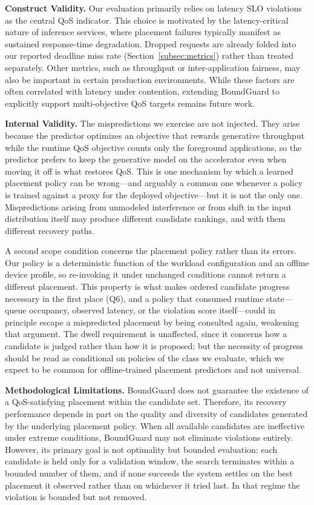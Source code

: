 \documentclass[conference]{IEEEtran}
\begin{document}
{\noindent\textbf{Construct Validity.} 
Our evaluation primarily relies on latency SLO violations as the central QoS indicator. This choice is motivated by the latency-critical nature of inference services, where placement failures typically manifest as sustained response-time degradation. \textcolor{navyblue}{Dropped requests are already folded into our reported deadline miss rate (Section~\ref{subsec:metrics}) rather than treated separately.} Other metrics, such as throughput or inter-application fairness, may also be important in certain production environments. While these factors are often correlated with latency under contention, extending BoundGuard to explicitly support multi-objective QoS targets remains future work.

\noindent\textcolor{navyblue}{\textbf{Internal Validity.}
The mispredictions we exercise are not injected. They arise because the predictor optimizes an objective that rewards generative throughput while the runtime QoS objective counts only the foreground applications, so the predictor prefers to keep the generative model on the accelerator even when moving it off is what restores QoS. This is one mechanism by which a learned placement policy can be wrong---and arguably a common one whenever a policy is trained against a proxy for the deployed objective---but it is not the only one. Mispredictions arising from unmodeled interference or from shift in the input distribution itself may produce different candidate rankings, and with them different recovery paths.}

\noindent\textcolor{navyblue}{A second scope condition concerns the placement policy rather than its errors. Our policy is a deterministic function of the workload configuration and an offline device profile, so re-invoking it under unchanged conditions cannot return a different placement. This property is what makes ordered candidate progress necessary in the first place (Q6), and a policy that consumed runtime state---queue occupancy, observed latency, or the violation score itself---could in principle escape a mispredicted placement by being consulted again, weakening that argument. The dwell requirement is unaffected, since it concerns how a candidate is judged rather than how it is proposed; but the necessity of progress should be read as conditional on policies of the class we evaluate, which we expect to be common for offline-trained placement predictors and not universal.}

\noindent\textbf{Methodological Limitations.} 
BoundGuard does not guarantee the existence of a QoS-satisfying placement within the candidate set. Therefore, its recovery performance depends in part on the quality and diversity of candidates generated by the underlying placement policy. When all available candidates are ineffective under extreme conditions, BoundGuard may not eliminate violations entirely. \textcolor{navyblue}{However, its primary goal is not optimality but bounded evaluation: each candidate is held only for a validation window, the search terminates within a bounded number of them, and if none succeeds the system settles on the best placement it observed rather than on whichever it tried last. In that regime the violation is bounded but not removed.}

}
\end{document}
